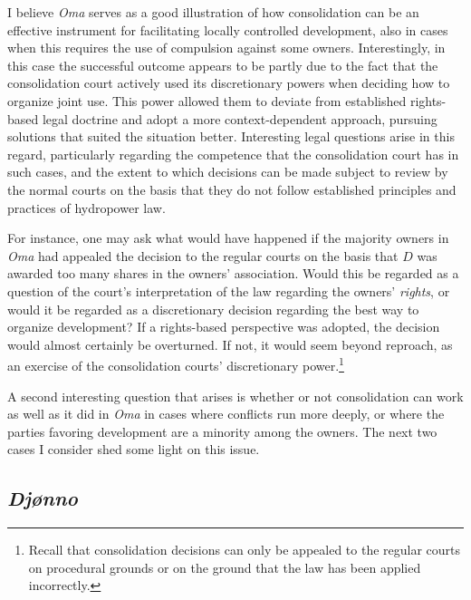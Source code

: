 I believe \emph{Oma} serves as a good illustration of how consolidation can be an effective instrument for facilitating locally controlled development, also in cases when this requires the use of compulsion against some owners. Interestingly, in this case the successful outcome appears to be partly due to the fact that the consolidation court actively used its discretionary powers when deciding how to organize joint use. This power allowed them to deviate from established rights-based legal doctrine and adopt a more context-dependent approach, pursuing solutions that suited the situation better. Interesting legal questions arise in this regard, particularly regarding the competence that the consolidation court has in such cases, and the extent to which decisions can be made subject to review by the normal courts on the basis that they do not follow established principles and practices of hydropower law.

For instance, one may ask what would have happened if the majority owners in \emph{Oma} had appealed the decision to the regular courts on the basis that $D$ was awarded too many shares in the owners' association. Would this be regarded as a question of the court's interpretation of the law regarding the owners' \emph{rights}, or would it be regarded as a discretionary decision regarding the best way to organize development? If a rights-based perspective was adopted, the decision would almost certainly be overturned. If not, it would seem beyond reproach, as an exercise of the consolidation courts' discretionary power.\footnote{Recall that consolidation decisions can only be appealed to the regular courts on procedural grounds or on the ground that the law has been applied incorrectly.}

A second interesting question that arises is whether or not consolidation can work as well as it did in \emph{Oma} in cases where conflicts run more deeply, or where the parties favoring development are a minority among the owners. The next two cases I consider shed some light on this issue.

\subsection{\emph{Djønno}}

